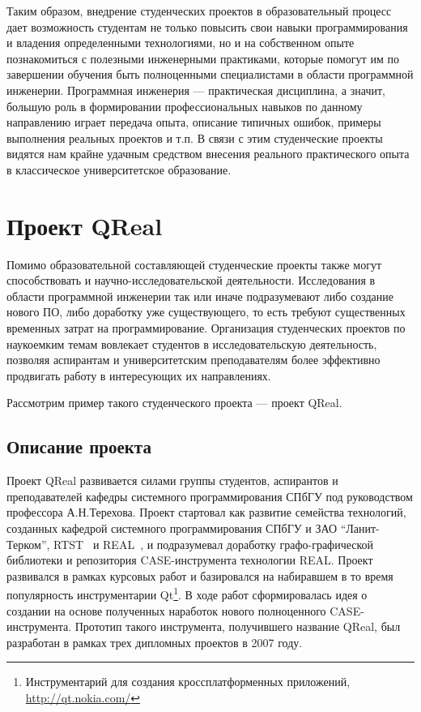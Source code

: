 \documentclass[a4paper]{article}
\begin{document}
Таким образом, внедрение студенческих проектов в образовательный процесс дает возможность студентам не только повысить свои навыки программирования и владения определенными технологиями, но и на собственном опыте познакомиться с полезными инженерными практиками, которые помогут им по завершении обучения быть полноценными специалистами в области программной инженерии. Программная инженерия --- практическая дисциплина, а значит, больш\textit{у}ю роль в формировании профессиональных навыков по данному направлению играет передача опыта, описание типичных ошибок, примеры выполнения реальных проектов и т.п. В связи с этим студенческие проекты видятся нам крайне удачным средством внесения реального практического опыта в классическое университетское образование.


\section{Проект QReal}

Помимо образовательной составляющей студенческие проекты также могут способствовать и научно-исследовательской деятельности. Исследования в области программной инженерии так или иначе подразумевают либо создание нового ПО, либо доработку уже существующего, то есть требуют существенных временных затрат на программирование. Организация студенческих проектов по наукоемким темам вовлекает студентов в исследовательскую деятельность, позволяя аспирантам и университетским преподавателям более эффективно продвигать работу в интересующих их направлениях.  

Рассмотрим пример такого студенческого проекта --- проект QReal. 

\subsection{Описание проекта}

Проект QReal развивается силами группы студентов, аспирантов и преподавателей кафедры системного программирования СПбГУ под руководством профессора А.Н.Терехова. Проект стартовал как развитие семейства технологий, созданных кафедрой системного программирования СПбГУ и ЗАО ``Ланит-Терком'', RTST~\cite{rtst} и REAL~\cite{real}, и подразумевал доработку графо-графической библиотеки и репозитория CASE-инструмента технологии REAL. Проект развивался в рамках курсовых работ и базировался на набиравшем в то время популярность инструментарии Qt\footnote{Инструментарий для создания кроссплатформенных приложений, \url{http://qt.nokia.com/}}. В ходе работ сформировалась идея о создании на основе полученных наработок нового полноценного CASE-инструмента. Прототип такого инструмента, получившего название QReal, был разработан в рамках трех дипломных проектов в 2007 году. 
\end{document}
